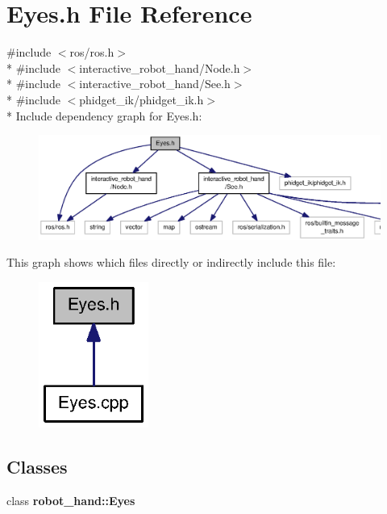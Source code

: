 \section{Eyes.\-h File Reference}
\label{Eyes_8h}
{\ttfamily \#include $<$ros/ros.\-h$>$}\\*
{\ttfamily \#include $<$interactive\-\_\-robot\-\_\-hand/\-Node.\-h$>$}\\*
{\ttfamily \#include $<$interactive\-\_\-robot\-\_\-hand/\-See.\-h$>$}\\*
{\ttfamily \#include $<$phidget\-\_\-ik/phidget\-\_\-ik.\-h$>$}\\*
Include dependency graph for Eyes.\-h\-:\nopagebreak
\begin{figure}[H]
\begin{center}
\leavevmode
\includegraphics[width=350pt]{Eyes_8h__incl}
\end{center}
\end{figure}
This graph shows which files directly or indirectly include this file\-:\nopagebreak
\begin{figure}[H]
\begin{center}
\leavevmode
\includegraphics[width=102pt]{Eyes_8h__dep__incl}
\end{center}
\end{figure}
\subsection*{Classes}
\begin{DoxyCompactItemize}
\item 
class {\bf robot\-\_\-hand\-::\-Eyes}
\end{DoxyCompactItemize}
